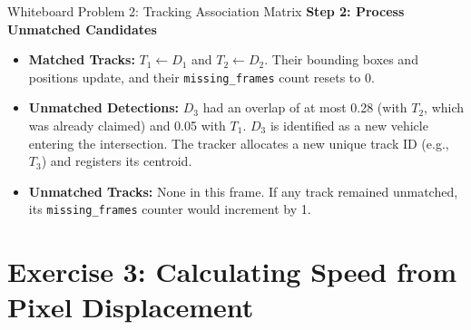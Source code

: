 \begin{interviewq}{Whiteboard Problem 2: Tracking Association Matrix}
\textbf{Step 2: Process Unmatched Candidates}
\begin{itemize}
    \item \textbf{Matched Tracks:} $T_1 \leftarrow D_1$ and $T_2 \leftarrow D_2$. Their bounding boxes and positions update, and their \texttt{missing\_frames} count resets to 0.
    \item \textbf{Unmatched Detections:} $D_3$ had an overlap of at most 0.28 (with $T_2$, which was already claimed) and 0.05 with $T_1$. $D_3$ is identified as a new vehicle entering the intersection. The tracker allocates a new unique track ID (e.g., $T_3$) and registers its centroid.
    \item \textbf{Unmatched Tracks:} None in this frame. If any track remained unmatched, its \texttt{missing\_frames} counter would increment by 1.
\end{itemize}
\end{interviewq}

\section{Exercise 3: Calculating Speed from Pixel Displacement}
\label{sec:wb_speed}

